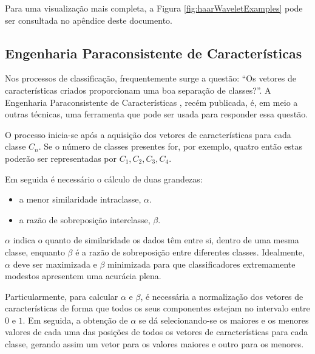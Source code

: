 			
			
			\par Para uma visualização mais completa, a Figura \ref{fig:haarWaveletExamples} pode ser consultada no apêndice deste documento.
			
			\subsection{Engenharia Paraconsistente de Características}
				\par Nos processos de classificação, frequentemente surge a questão: ``Os vetores de características criados proporcionam uma boa separação de classes?''. A Engenharia Paraconsistente de Características \cite{XXXXXX}, recém publicada, é, em meio a outras técnicas, uma ferramenta que pode ser usada para responder essa questão.
				
				\par O processo inicia-se após a aquisição dos vetores de características para cada classe $C_n$. Se o número de classes presentes for, por exemplo, quatro então estas poderão ser representadas por $C_1, C_2, C_3, C_4$.
				\par Em seguida é necessário o cálculo de duas grandezas:
				
				\begin{itemize}
					\item a menor similaridade intraclasse, $\alpha$.
					\item a razão de sobreposição interclasse, $\beta$.
				\end{itemize}
			
				\par $\alpha$ indica o quanto de similaridade os dados têm entre si, dentro de uma mesma classe, enquanto $\beta$ é a razão de sobreposição entre diferentes classes. Idealmente, $\alpha$ deve ser maximizada e $\beta$ minimizada para que classificadores extremamente modestos apresentem uma acurácia plena.
				
				\par Particularmente, para calcular $\alpha$ e $\beta$, é necessária a normalização dos vetores de características de forma que todos os seus componentes estejam no intervalo entre $0$ e $1$. Em seguida, a obtenção de $\alpha$ se dá selecionando-se os maiores e os menores valores de cada uma das posições de todos os vetores de características para cada classe, gerando assim um vetor para os valores maiores e outro para os menores.
				
